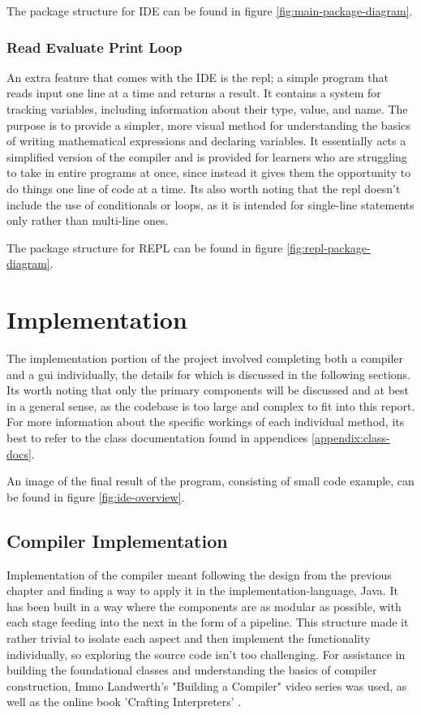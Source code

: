 \documentclass[
]{report}
\begin{document}
The package structure for IDE can be found in figure \ref{fig:main-package-diagram}.

\subsection{Read Evaluate Print Loop}
An extra feature that comes with the IDE is the \acrshort{repl}; a simple program
that reads input one line at a time and returns a result. It contains a
system for tracking variables, including information about their type,
value, and name. The purpose is to provide a simpler, more visual method
for understanding the basics of writing mathematical \glspl{expression} and
declaring variables. It essentially acts a simplified version of the
compiler and is provided for learners who are struggling to take in
entire programs at once, since instead it gives them the opportunity to
do things one line of code at a time. Its also worth noting that the
\acrshort{repl} doesn't include the use of conditionals or loops, as it is intended
for single-line \glspl{statement} only rather than multi-line ones.

The package structure for REPL can be found in figure \ref{fig:repl-package-diagram}.

\chapter{Implementation}
The implementation portion of the project involved completing both a
compiler and a \acrshort{gui} individually, the details for which is discussed in
the following sections. Its worth noting that only the primary
components will be discussed and at best in a general sense, as the
codebase is too large and complex to fit into this report. For more
information about the specific workings of each individual method, its
best to refer to the class documentation found in appendices \ref{appendix:class-docs}.

An image of the final result of the program, consisting of small code example, can
be found in figure \ref{fig:ide-overview}.

\section{Compiler Implementation}
Implementation of the compiler meant following the design from the
previous chapter and finding a way to apply it in the \gls{implementation-language}, Java.
It has been built in a way where the components are as modular as possible, with
each stage feeding into the next in the form of a pipeline. This
structure made it rather trivial to isolate each aspect and then
implement the functionality individually, so exploring the source code
isn't too challenging. For assistance in building the foundational classes
and understanding the basics of compiler construction, Immo Landwerth's "Building
a Compiler" video series \cite{compiler-video} was used, as well as the online
book 'Crafting Interpreters' \cite{crafting-interpreters}.
\end{document}
